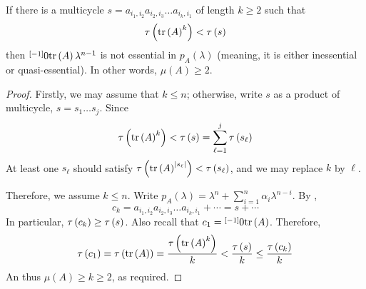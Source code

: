 \begin{lem}\label{lem:multicycle-ge-tr}
If there is a multicycle $s=a_{i_1,i_{2}}a_{i_{2},i_{3}}\dots a_{i_{k},i_1}$ of length $k\ge 2$ such that $$\tau\left(\textnormal{tr}\left(A\right)^k\right)<\tau\left(s\right)$$
then $\overset{\left[-1\right]}{}0\textnormal{tr}\left(A\right)\lambda^{n-1}$ is not essential in $p_{A}\left(\lambda\right)$ (meaning, it is either inessential or quasi-essential). In other words, $\mu\left(A\right)\ge 2$.
\end{lem}
\begin{proof}
Firstly, we may assume that $k\leq n$; otherwise, write $s$ as a product of multicycle, $s=s_1\dots s_j$. Since
$$\tau\left(\textnormal{tr}\left(A\right)^k\right)<\tau\left(s\right)=\sum_{\ell=1}^j\tau\left(s_\ell\right)$$
At least one $s_\ell$ should satisfy $\tau\left(\textnormal{tr}\left(A\right)^{\left|s_\ell\right|}\right)<\tau\left(s_\ell\right)$, and we may replace $k$ by $\ell$.

Therefore, we assume $k\leq n$. Write $p_{A}\left(\lambda\right)=\lambda^{n}+{\displaystyle \sum_{i=1}^{n}}\alpha_{i}\lambda^{n-i}$. By ,
$$c_k=a_{i_1,i_{2}}a_{i_{2},i_{3}}\dots a_{i_{k},i_1}+\cdots=s+\cdots$$
In particular, $\tau\left(c_k\right)\ge\tau\left(s\right)$. Also recall that $c_1=\overset{\left[-1\right]}{}0\textnormal{tr}\left(A\right)$. Therefore,
$$\tau\left(c_1\right)=\tau\left(\textnormal{tr}\left(A\right)\right)=\frac{\tau\left(\textnormal{tr}\left(A\right)^k\right)}{k}< \frac{\tau\left(s\right)}{k}\leq\frac{\tau\left(c_k\right)}{k}$$
An thus $\mu\left(A\right)\ge k\ge 2$, as required.
\end{proof}


